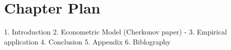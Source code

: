 \section{Chapter Plan}

1. Introduction 
2. Econometric Model (Cherkonov paper) 
- 
3. Empirical application
4. Conclusion
5. Appendix
6. Biblography


